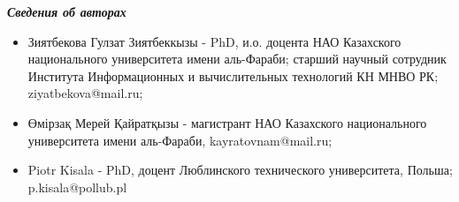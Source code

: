 \emph{{\bfseries Сведения об авторах}}

\begin{itemize}
\item
Зиятбекова Гулзат Зиятбеккызы - PhD, и.о. доцента НАО Казахского
национального университета имени аль-Фараби; старший научный сотрудник
Института Информационных и вычислительных технологий КН МНВО РК;
ziyatbekova@mail.ru;

\item
Өмірзақ Мерей Қайратқызы - магистрант НАО Казахского национального
университета имени аль-Фараби, kayratovnam@mail.ru;

\item
Piotr Kisala - PhD, доцент Люблинского технического университета,
Польша; p.kisala@pollub.pl
\end{itemize}
